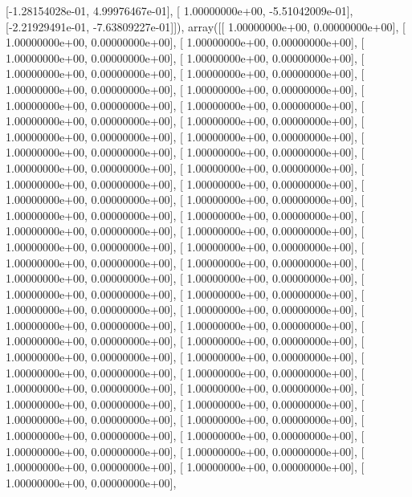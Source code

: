 \documentclass{article}
\begin{document}
       [-1.28154028e-01,  4.99976467e-01],
       [ 1.00000000e+00, -5.51042009e-01],
       [-2.21929491e-01, -7.63809227e-01]]), array([[ 1.00000000e+00,  0.00000000e+00],
       [ 1.00000000e+00,  0.00000000e+00],
       [ 1.00000000e+00,  0.00000000e+00],
       [ 1.00000000e+00,  0.00000000e+00],
       [ 1.00000000e+00,  0.00000000e+00],
       [ 1.00000000e+00,  0.00000000e+00],
       [ 1.00000000e+00,  0.00000000e+00],
       [ 1.00000000e+00,  0.00000000e+00],
       [ 1.00000000e+00,  0.00000000e+00],
       [ 1.00000000e+00,  0.00000000e+00],
       [ 1.00000000e+00,  0.00000000e+00],
       [ 1.00000000e+00,  0.00000000e+00],
       [ 1.00000000e+00,  0.00000000e+00],
       [ 1.00000000e+00,  0.00000000e+00],
       [ 1.00000000e+00,  0.00000000e+00],
       [ 1.00000000e+00,  0.00000000e+00],
       [ 1.00000000e+00,  0.00000000e+00],
       [ 1.00000000e+00,  0.00000000e+00],
       [ 1.00000000e+00,  0.00000000e+00],
       [ 1.00000000e+00,  0.00000000e+00],
       [ 1.00000000e+00,  0.00000000e+00],
       [ 1.00000000e+00,  0.00000000e+00],
       [ 1.00000000e+00,  0.00000000e+00],
       [ 1.00000000e+00,  0.00000000e+00],
       [ 1.00000000e+00,  0.00000000e+00],
       [ 1.00000000e+00,  0.00000000e+00],
       [ 1.00000000e+00,  0.00000000e+00],
       [ 1.00000000e+00,  0.00000000e+00],
       [ 1.00000000e+00,  0.00000000e+00],
       [ 1.00000000e+00,  0.00000000e+00],
       [ 1.00000000e+00,  0.00000000e+00],
       [ 1.00000000e+00,  0.00000000e+00],
       [ 1.00000000e+00,  0.00000000e+00],
       [ 1.00000000e+00,  0.00000000e+00],
       [ 1.00000000e+00,  0.00000000e+00],
       [ 1.00000000e+00,  0.00000000e+00],
       [ 1.00000000e+00,  0.00000000e+00],
       [ 1.00000000e+00,  0.00000000e+00],
       [ 1.00000000e+00,  0.00000000e+00],
       [ 1.00000000e+00,  0.00000000e+00],
       [ 1.00000000e+00,  0.00000000e+00],
       [ 1.00000000e+00,  0.00000000e+00],
       [ 1.00000000e+00,  0.00000000e+00],
       [ 1.00000000e+00,  0.00000000e+00],
       [ 1.00000000e+00,  0.00000000e+00],
       [ 1.00000000e+00,  0.00000000e+00],
       [ 1.00000000e+00,  0.00000000e+00],
       [ 1.00000000e+00,  0.00000000e+00],
       [ 1.00000000e+00,  0.00000000e+00],
       [ 1.00000000e+00,  0.00000000e+00],
       [ 1.00000000e+00,  0.00000000e+00],
       [ 1.00000000e+00,  0.00000000e+00],
       [ 1.00000000e+00,  0.00000000e+00],
       [ 1.00000000e+00,  0.00000000e+00],
       [ 1.00000000e+00,  0.00000000e+00],
       [ 1.00000000e+00,  0.00000000e+00],
       [ 1.00000000e+00,  0.00000000e+00],
       [ 1.00000000e+00,  0.00000000e+00],
\end{document}
